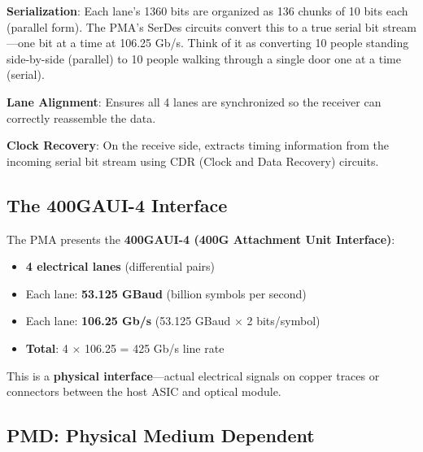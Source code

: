 \documentclass[openany]{tufte-book}
\begin{document}

\textbf{Serialization}: Each lane's 1360 bits are organized as 136 chunks of 10 bits each (parallel form). The PMA's SerDes circuits convert this to a true serial bit stream---one bit at a time at 106.25 Gb/s. Think of it as converting 10 people standing side-by-side (parallel) to 10 people walking through a single door one at a time (serial).


\textbf{Lane Alignment}: Ensures all 4 lanes are synchronized so the receiver can correctly reassemble the data.

\textbf{Clock Recovery}: On the receive side, extracts timing information from the incoming serial bit stream using CDR (Clock and Data Recovery) circuits.


\subsection{The 400GAUI-4 Interface}

The PMA presents the \textbf{400GAUI-4 (400G Attachment Unit Interface)}:

\begin{itemize}
\item \textbf{4 electrical lanes} (differential pairs)
\item Each lane: \textbf{53.125 GBaud} (billion symbols per second)
\item Each lane: \textbf{106.25 Gb/s} (53.125 GBaud × 2 bits/symbol)
\item \textbf{Total}: 4 × 106.25 = 425 Gb/s line rate
\end{itemize}

This is a \textbf{physical interface}---actual electrical signals on copper traces or connectors between the host ASIC and optical module.

\subsection{PMD: Physical Medium Dependent}
\end{document}
